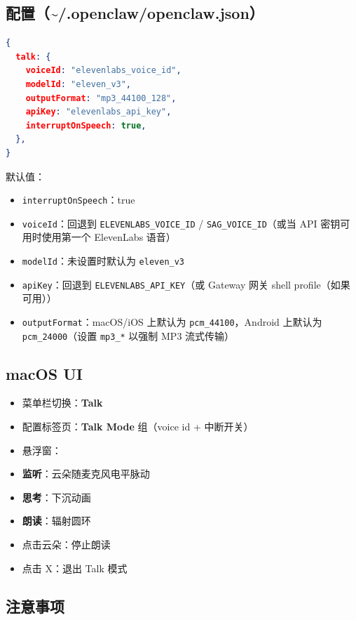 \subsection{配置（\textasciitilde{}/.openclaw/openclaw.json）}


\begin{lstlisting}[language=json]
{
  talk: {
    voiceId: "elevenlabs_voice_id",
    modelId: "eleven_v3",
    outputFormat: "mp3_44100_128",
    apiKey: "elevenlabs_api_key",
    interruptOnSpeech: true,
  },
}
\end{lstlisting}


默认值：

\begin{itemize}
  \item \texttt{interruptOnSpeech}：true
  \item \texttt{voiceId}：回退到 \texttt{ELEVENLABS\_VOICE\_ID} / \texttt{SAG\_VOICE\_ID}（或当 API 密钥可用时使用第一个 ElevenLabs 语音）
  \item \texttt{modelId}：未设置时默认为 \texttt{eleven\_v3}
  \item \texttt{apiKey}：回退到 \texttt{ELEVENLABS\_API\_KEY}（或 Gateway 网关 shell profile（如果可用））
  \item \texttt{outputFormat}：macOS/iOS 上默认为 \texttt{pcm\_44100}，Android 上默认为 \texttt{pcm\_24000}（设置 \texttt{mp3\_*} 以强制 MP3 流式传输）
\end{itemize}


\subsection{macOS UI}


\begin{itemize}
  \item 菜单栏切换：\textbf{Talk}
  \item 配置标签页：\textbf{Talk Mode} 组（voice id + 中断开关）
  \item 悬浮窗：
  \item \textbf{监听}：云朵随麦克风电平脉动
  \item \textbf{思考}：下沉动画
  \item \textbf{朗读}：辐射圆环
  \item 点击云朵：停止朗读
  \item 点击 X：退出 Talk 模式
\end{itemize}


\subsection{注意事项}


